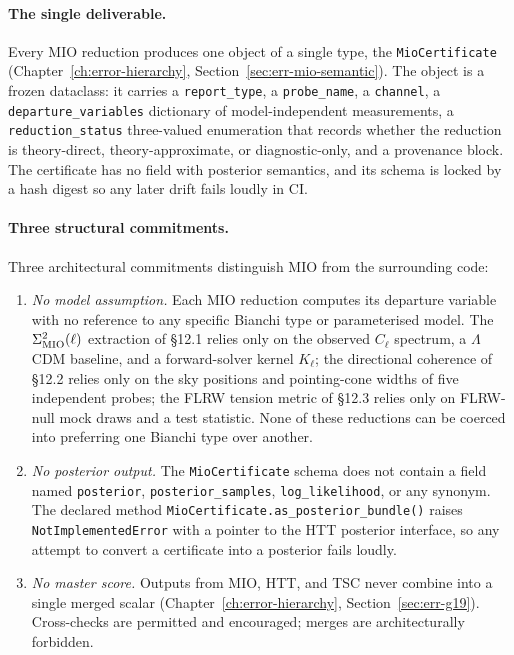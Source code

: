 \paragraph{The single deliverable.}

Every MIO reduction produces one object of a single type, the
\texttt{MioCertificate} (Chapter~\ref{ch:error-hierarchy},
Section~\ref{sec:err-mio-semantic}).  The object is a frozen
dataclass: it carries a \texttt{report\_type}, a
\texttt{probe\_name}, a \texttt{channel}, a
\texttt{departure\_variables} dictionary of model-independent
measurements, a \texttt{reduction\_status} three-valued
enumeration that records whether the reduction is
theory-direct, theory-approximate, or diagnostic-only, and a
provenance block.  The certificate has no field with
posterior semantics, and its schema is locked by a hash digest
so any later drift fails loudly in CI.

\paragraph{Three structural commitments.}

Three architectural commitments distinguish MIO from the
surrounding code:

\begin{enumerate}
\item \emph{No model assumption.}  Each MIO reduction computes
  its departure variable with no reference to any specific
  Bianchi type or parameterised model.  The $\Sigma^2_{\rm
  MIO}(\ell)$ extraction of §12.1 relies only on the
  observed $C_\ell$ spectrum, a $\Lambda$CDM baseline, and a
  forward-solver kernel $K_\ell$; the directional coherence
  of §12.2 relies only on the sky positions and
  pointing-cone widths of five independent probes; the FLRW
  tension metric of §12.3 relies only on FLRW-null mock
  draws and a test statistic.  None of these reductions can
  be coerced into preferring one Bianchi type over another.
\item \emph{No posterior output.}  The
  \texttt{MioCertificate} schema does not contain a field
  named \texttt{posterior}, \texttt{posterior\_samples},
  \texttt{log\_likelihood}, or any synonym.  The declared
  method
  \texttt{MioCertificate.as\_posterior\_bundle()} raises
  \texttt{NotImplementedError} with a pointer to the HTT
  posterior interface, so any attempt to convert a
  certificate into a posterior fails loudly.
\item \emph{No master score.}  Outputs from MIO, HTT, and
  TSC never combine into a single merged scalar
  (Chapter~\ref{ch:error-hierarchy},
  Section~\ref{sec:err-g19}).  Cross-checks are permitted
  and encouraged; merges are architecturally forbidden.
\end{enumerate}

